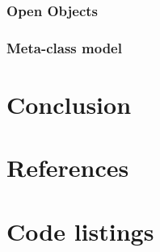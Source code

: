 \documentclass[12pt,a4paper,twocolumn]{article}
\begin{document}
\subsubsection{Open Objects}
\subsubsection{Meta-class model}

\section{Conclusion}
\section{References}
\newpage
\section{Code listings}










\end{document}
